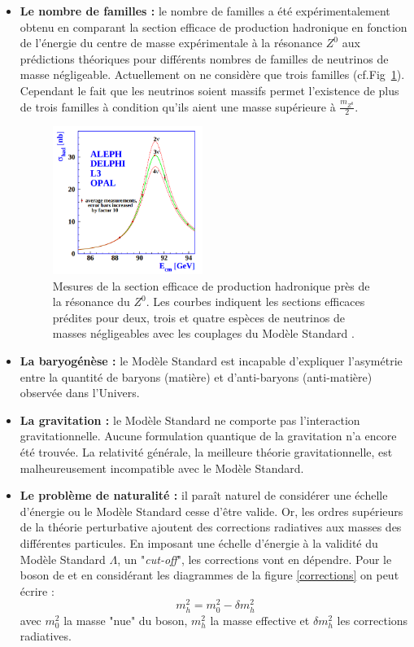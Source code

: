 \begin{itemize}[label=$\bullet$]
\item \textbf{Le nombre de familles :} le nombre de familles a été expérimentalement obtenu en comparant la section efficace de production hadronique en fonction de l'énergie du centre de masse expérimentale à la résonance $Z^{0}$ aux prédictions théoriques pour différents nombres de familles de neutrinos de masse négligeable. Actuellement on ne considère que trois familles (cf.Fig~\ref{neutrinos}). Cependant le fait que les neutrinos soient massifs permet l'existence de plus de trois familles à condition qu'ils aient une masse supérieure à $\frac{m_{Z^{0}}}{2}$.
\begin{figure}[ht!]
\centering
\includegraphics[width=0.46\textwidth]{SM/neutrinos.png}
\captionsetup{type=figure}\caption{Mesures de la section efficace de production hadronique près de la résonance du $Z^0$. Les courbes indiquent les sections efficaces prédites pour deux, trois et quatre espèces de neutrinos de masses négligeables avec les couplages du Modèle Standard \cite{2006257}.}
\label{neutrinos}
\end{figure}

\item \textbf{La baryogénèse :} le Modèle Standard est incapable d'expliquer l'asymétrie entre la quantité de baryons (matière) et d'anti-baryons (anti-matière) observée dans l'Univers.

\item \textbf{La gravitation :} le Modèle Standard ne comporte pas l'interaction gravitationnelle. Aucune formulation quantique de la gravitation n'a encore été trouvée. La relativité générale, la meilleure théorie gravitationnelle, est malheureusement incompatible avec le Modèle Standard.

\item \textbf{Le problème de naturalité :} il paraît naturel de considérer une échelle d'énergie ou le Modèle Standard cesse d'être valide. Or, les ordres supérieurs de la théorie perturbative ajoutent des corrections radiatives aux masses des différentes particules. En imposant une échelle d'énergie à la validité du Modèle Standard $\Lambda$, un "\textit{cut-off}", les corrections vont en dépendre. Pour le boson de  et en considérant les diagrammes de la figure \ref{corrections} on peut écrire :
\begin{equation}
m_{h}^{2}=m_{0}^{2}-\delta m_{h}^{2}
\end{equation}
avec $m_{0}^{2}$ la masse "nue" du boson, $m_{h}^{2}$ la masse effective et $\delta m_{h}^{2}$ les corrections radiatives.


\end{itemize}
